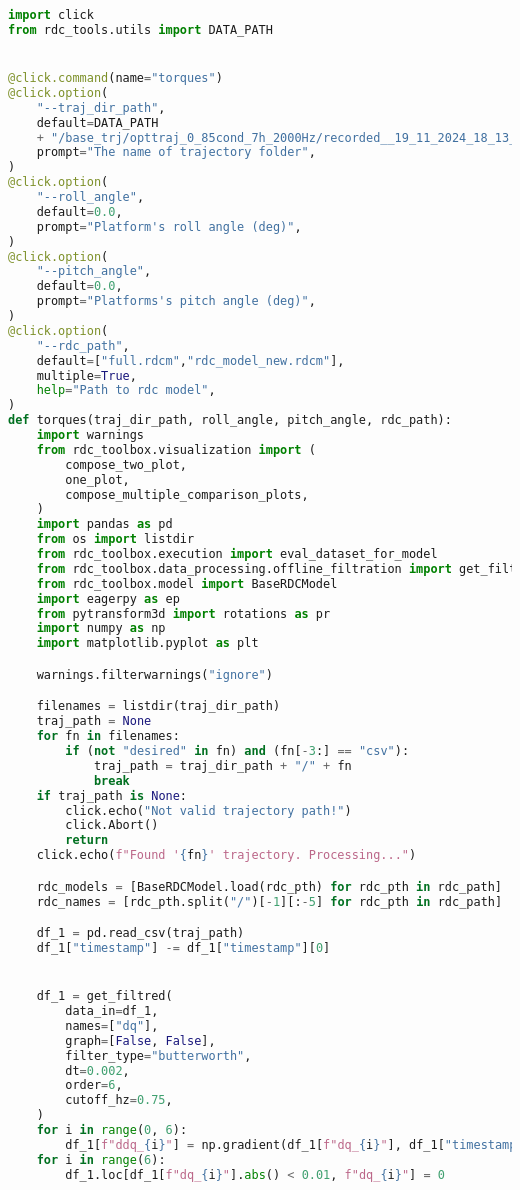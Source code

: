 \begin{lstlisting}[language=python, caption=\raggedright{verification/torques\_verification.py}, frame=single]
import click
from rdc_tools.utils import DATA_PATH


@click.command(name="torques")
@click.option(
    "--traj_dir_path",
    default=DATA_PATH
    + "/base_trj/opttraj_0_85cond_7h_2000Hz/recorded__19_11_2024_18_13_56",
    prompt="The name of trajectory folder",
)
@click.option(
    "--roll_angle",
    default=0.0,
    prompt="Platform's roll angle (deg)",
)
@click.option(
    "--pitch_angle",
    default=0.0,
    prompt="Platforms's pitch angle (deg)",
)
@click.option(
    "--rdc_path",
    default=["full.rdcm","rdc_model_new.rdcm"],
    multiple=True,
    help="Path to rdc model",
)
def torques(traj_dir_path, roll_angle, pitch_angle, rdc_path):
    import warnings
    from rdc_toolbox.visualization import (
        compose_two_plot,
        one_plot,
        compose_multiple_comparison_plots,
    )
    import pandas as pd
    from os import listdir
    from rdc_toolbox.execution import eval_dataset_for_model
    from rdc_toolbox.data_processing.offline_filtration import get_filtred
    from rdc_toolbox.model import BaseRDCModel
    import eagerpy as ep
    from pytransform3d import rotations as pr
    import numpy as np
    import matplotlib.pyplot as plt

    warnings.filterwarnings("ignore")

    filenames = listdir(traj_dir_path)
    traj_path = None
    for fn in filenames:
        if (not "desired" in fn) and (fn[-3:] == "csv"):
            traj_path = traj_dir_path + "/" + fn
            break
    if traj_path is None:
        click.echo("Not valid trajectory path!")
        click.Abort()
        return
    click.echo(f"Found '{fn}' trajectory. Processing...")

    rdc_models = [BaseRDCModel.load(rdc_pth) for rdc_pth in rdc_path]
    rdc_names = [rdc_pth.split("/")[-1][:-5] for rdc_pth in rdc_path]

    df_1 = pd.read_csv(traj_path)
    df_1["timestamp"] -= df_1["timestamp"][0]


    df_1 = get_filtred(
        data_in=df_1,
        names=["dq"],
        graph=[False, False],
        filter_type="butterworth",
        dt=0.002,
        order=6,
        cutoff_hz=0.75,
    )
    for i in range(0, 6):
        df_1[f"ddq_{i}"] = np.gradient(df_1[f"dq_{i}"], df_1["timestamp"])
    for i in range(6):
        df_1.loc[df_1[f"dq_{i}"].abs() < 0.01, f"dq_{i}"] = 0


\end{lstlisting}
